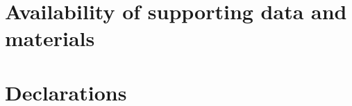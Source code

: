 \documentclass[a4paper,num-refs]{oup-contemporary}
\begin{document}

\section{Availability of supporting data and materials}






\section{Declarations}
\end{document}
